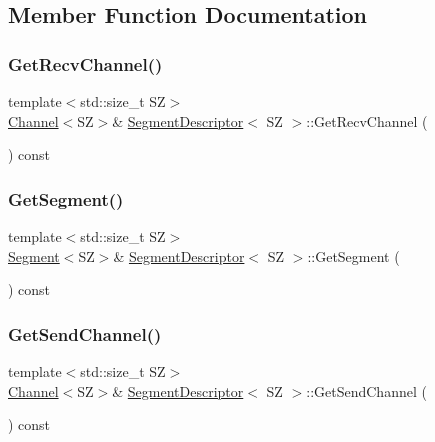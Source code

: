 \subsection{Member Function Documentation}
\mbox{\label{classSegmentDescriptor_a3b7cb0548fb39870191fce0d42b20494}} 
\subsubsection{\texorpdfstring{Get\+Recv\+Channel()}{GetRecvChannel()}}
{\footnotesize\ttfamily template$<$std\+::size\+\_\+t SZ$>$ \\
\hyperlink{classChannel}{Channel}$<$SZ$>$\& \hyperlink{classSegmentDescriptor}{Segment\+Descriptor}$<$ SZ $>$\+::Get\+Recv\+Channel (\begin{DoxyParamCaption}{ }\end{DoxyParamCaption}) const\hspace{0.3cm}{\ttfamily [inline]}}

\mbox{\label{classSegmentDescriptor_a11f3ac05bd4f223fac0c67e54b44cd7f}} 
\subsubsection{\texorpdfstring{Get\+Segment()}{GetSegment()}}
{\footnotesize\ttfamily template$<$std\+::size\+\_\+t SZ$>$ \\
\hyperlink{classSegment}{Segment}$<$SZ$>$\& \hyperlink{classSegmentDescriptor}{Segment\+Descriptor}$<$ SZ $>$\+::Get\+Segment (\begin{DoxyParamCaption}{ }\end{DoxyParamCaption}) const\hspace{0.3cm}{\ttfamily [inline]}}

\mbox{\label{classSegmentDescriptor_a2f9e15ad56caf25a73a76ebb9dcfd26e}} 
\subsubsection{\texorpdfstring{Get\+Send\+Channel()}{GetSendChannel()}}
{\footnotesize\ttfamily template$<$std\+::size\+\_\+t SZ$>$ \\
\hyperlink{classChannel}{Channel}$<$SZ$>$\& \hyperlink{classSegmentDescriptor}{Segment\+Descriptor}$<$ SZ $>$\+::Get\+Send\+Channel (\begin{DoxyParamCaption}{ }\end{DoxyParamCaption}) const\hspace{0.3cm}{\ttfamily [inline]}}

